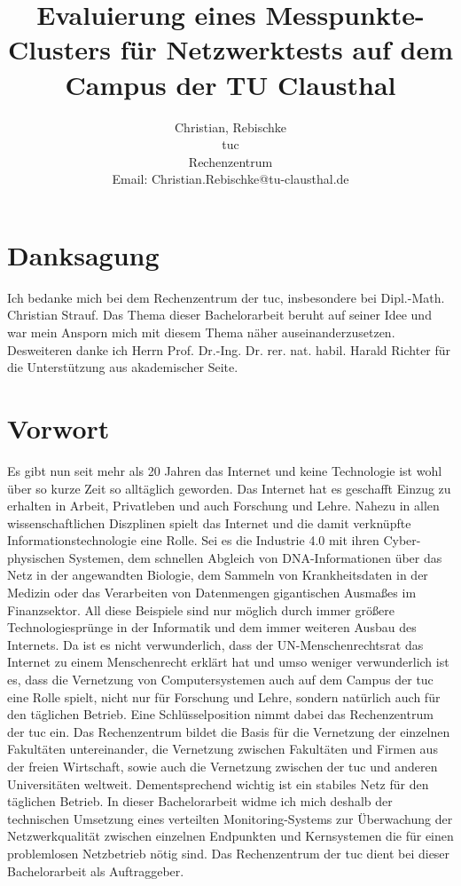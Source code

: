 \documentclass[titlepage]{report}
\title{Evaluierung eines Messpunkte-Clusters für Netzwerktests auf dem
Campus der TU Clausthal}
\author{Christian, Rebischke\\
\gls{tuc}\\
Rechenzentrum\\
Email: Christian.Rebischke@tu-clausthal.de}
\begin{document}
\maketitle
\chapter*{Danksagung}
Ich bedanke mich bei dem Rechenzentrum der \gls{tuc}, insbesondere bei
Dipl.\hyp{}Math. Christian Strauf. Das Thema dieser Bachelorarbeit
beruht auf seiner Idee und war mein Ansporn mich mit diesem Thema näher
auseinanderzusetzen. Desweiteren danke ich Herrn Prof. Dr.\hyp{}Ing. Dr.
rer. nat. habil. Harald Richter für die Unterstützung aus akademischer
Seite.
\tableofcontents
\chapter*{Vorwort}
Es gibt nun seit mehr als 20 Jahren das Internet und keine Technologie
ist wohl über so kurze Zeit so alltäglich geworden. Das Internet hat es
geschafft Einzug zu erhalten in Arbeit, Privatleben und auch Forschung
und Lehre. Nahezu in allen wissenschaftlichen Diszplinen spielt das
Internet und die damit verknüpfte Informationstechnologie eine Rolle.
Sei es die Industrie 4.0 mit ihren Cyber-physischen Systemen, dem
schnellen Abgleich von DNA-Informationen über das Netz in der
angewandten Biologie, dem Sammeln von Krankheitsdaten in der Medizin
oder das Verarbeiten von Datenmengen gigantischen Ausmaßes im
Finanzsektor. All diese Beispiele sind nur möglich durch immer größere
Technologiesprünge in der Informatik und dem immer weiteren Ausbau des
Internets. Da ist es nicht verwunderlich, dass der UN-Menschenrechtsrat das
Internet zu einem Menschenrecht\cite{UNHRC} erklärt hat und umso weniger
verwunderlich ist es, dass die Vernetzung von Computersystemen auch auf
dem Campus der \gls{tuc} eine Rolle spielt,
nicht nur für Forschung und Lehre, sondern natürlich auch für den
täglichen Betrieb. Eine Schlüsselposition nimmt dabei das Rechenzentrum
der \gls{tuc} ein. Das Rechenzentrum bildet die
Basis für die Vernetzung der einzelnen Fakultäten untereinander, die
Vernetzung zwischen Fakultäten und Firmen aus der freien Wirtschaft,
sowie auch die Vernetzung zwischen der \gls{tuc}
und anderen Universitäten weltweit. Dementsprechend wichtig ist ein
stabiles Netz für den täglichen Betrieb. In dieser Bachelorarbeit widme
ich mich deshalb der technischen Umsetzung eines verteilten
Monitoring-Systems zur Überwachung der Netzwerkqualität zwischen
einzelnen Endpunkten und Kernsystemen die für einen problemlosen
Netzbetrieb nötig sind. Das Rechenzentrum der \gls{tuc} dient bei dieser
Bachelorarbeit als Auftraggeber.
\end{document}
